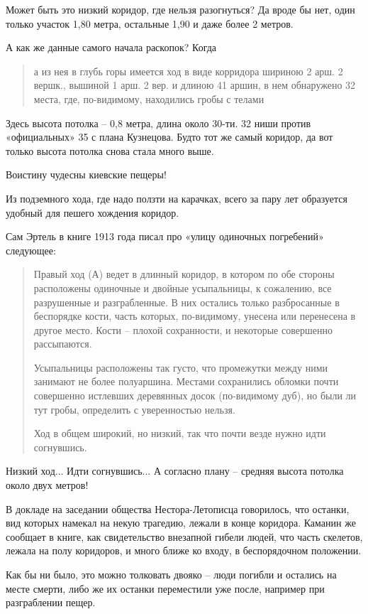 Может быть это низкий коридор, где нельзя разогнуться? Да вроде бы нет, один только участок 1,80 метра, остальные 1,90 и даже более 2 метров. 

А как же данные самого начала раскопок? Когда

\begin{quotation}
а из нея в глубь горы имеется ход в виде корридора шириною 2 арш. 2 вершк., вышиной 1 арш. 2 вер. и длиною 41 аршин, в нем обнаружено 32 места, где, по-видимому, находились гробы с телами
\end{quotation}

Здесь высота потолка – 0,8 метра, длина около 30-ти. 32 ниши против «официальных» 35 с плана Кузнецова. Будто тот же самый коридор, да вот только высота потолка снова стала много выше. 

Воистину чудесны киевские пещеры! 

Из подземного хода, где надо ползти на карачках, всего за пару лет образуется удобный для пешего хождения коридор.

Сам Эртель в книге 1913 года писал про «улицу одиночных погребений» следующее:

\begin{quotation}
Правый ход (А) ведет в длинный коридор, в котором по обе стороны расположены одиночные и двойные усыпальницы, к сожалению, все разрушенные и разграбленные. В них остались только разбросанные в беспорядке кости, часть которых, по-видимому, унесена или перенесена в другое место. Кости – плохой сохранности, и некоторые совершенно рассыпаются.

Усыпальницы расположены так густо, что промежутки между ними занимают не более полуаршина. Местами сохранились обломки почти совершенно истлевших деревянных досок (по-видимому дуб), но были ли тут гробы, определить с уверенностью нельзя.

Ход в общем широкий, но низкий, так что почти везде нужно идти согнувшись.
\end{quotation}

Низкий ход... Идти согнувшись... А согласно плану – средняя высота потолка около двух метров!

В докладе на заседании общества Нестора-Летописца говорилось, что останки, вид которых намекал на некую трагедию, лежали в конце коридора. Каманин же сообщает в книге, как свидетельство внезапной гибели людей, что часть скелетов, лежала на полу коридоров, и много ближе ко входу, в беспорядочном положении.

Как бы ни было, это можно толковать двояко – люди погибли и остались на месте смерти, либо же их останки переместили уже после, например при разграблении пещер.

